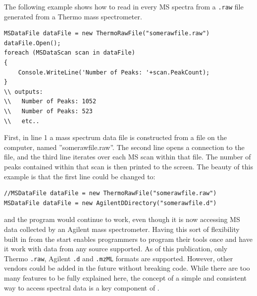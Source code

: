 The following example shows how to read in every MS spectra from a \texttt{.raw} file generated from a Thermo mass spectrometer.
\begin{lstlisting}
MSDataFile dataFile = new ThermoRawFile("somerawfile.raw")
dataFile.Open();                   
foreach (MSDataScan scan in dataFile)
{             
    Console.WriteLine('Number of Peaks: '+scan.PeakCount);
}
\\ outputs:
\\   Number of Peaks: 1052
\\   Number of Peaks: 523
\\   etc..
\end{lstlisting}
First, in line 1 a mass spectrum data file is constructed from a file on the computer, named ''somerawfile.raw''. The second line opens a connection to the file, and the third line iterates over each MS scan within that file. The number of peaks contained within that scan is then printed to the screen. The beauty of this example is that the first line could be changed to:
\begin{lstlisting}
//MSDataFile dataFile = new ThermoRawFile("somerawfile.raw")
MSDataFile dataFile = new AgilentDDirectory("somerawfile.d")
\end{lstlisting}
and the program would continue to work, even though it is now accessing MS data collected by an Agilent mass spectrometer. Having this sort of flexibility built in from the start enables programmers to program their tools once and have it work with data from any source supported. As of this publication, only Thermo \texttt{.raw}, Agilent \texttt{.d} and \texttt{.mzML} formats are supported. However, other vendors could be added in the future without breaking code. While there are too many features to be fully explained here, the concept of a simple and consistent way to access spectral data is a key component of \csmsl{}. 


